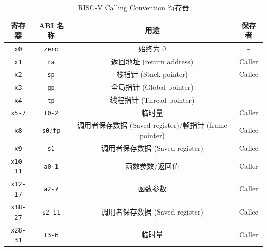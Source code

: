 \begin{table}[htb]
\centering
\begin{tabular}{|c|c|c|c|}
\hline
寄存器 & ABI 名称 & 用途 & 保存者 \\
\hline
\texttt{x0} & \texttt{zero} & 始终为 0 & - \\
\texttt{x1} & \texttt{ra} & 返回地址 (return address) & Caller \\
\texttt{x2} & \texttt{sp} & 栈指针 (Stack pointer) & Callee \\
\texttt{x3} & \texttt{gp} & 全局指针 (Global pointer) & - \\
\texttt{x4} & \texttt{tp} & 线程指针 (Thread pointer) & - \\
\texttt{x5-7} & \texttt{t0-2} & 临时量 & Caller \\
\texttt{x8} & \texttt{s0}/\texttt{fp} & 调用者保存数据 (Saved register)/帧指针 (frame pointer) & Callee \\
\texttt{x9} & \texttt{s1} & 调用者保存数据 (Saved register) & Callee \\
\texttt{x10-11} & \texttt{a0-1} & 函数参数/返回值 & Caller \\
\texttt{x12-17} & \texttt{a2-7} & 函数参数 & Caller \\
\texttt{x18-27} & \texttt{s2-11} & 调用者保存数据 (Saved register) & Callee \\
\texttt{x28-31} & \texttt{t3-6} & 临时量 & Caller \\
\hline
\end{tabular}
\caption{RISC-V Calling Convention 寄存器}\label{RV-calling-convention}
\end{table}
